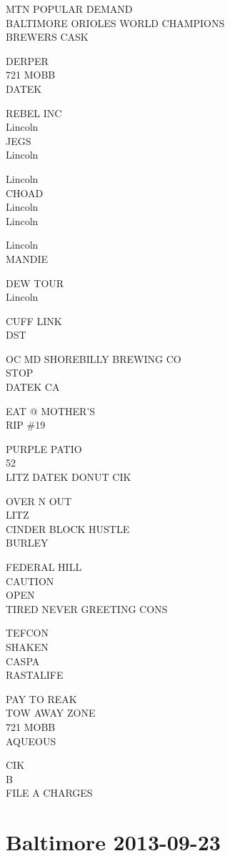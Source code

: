 \documentclass[10pt,letterpaper]{article}
\begin{document}
MTN POPULAR DEMAND\\
BALTIMORE ORIOLES WORLD CHAMPIONS\\
BREWERS CASK

DERPER\\
721 MOBB\\
DATEK

REBEL INC\\
Lincoln\\
JEGS\\
Lincoln

Lincoln\\
CHOAD\\
Lincoln\\
Lincoln

Lincoln\\
MANDIE

DEW TOUR\\
Lincoln

CUFF LINK\\
DST

OC MD SHOREBILLY BREWING CO\\
STOP\\
DATEK CA

EAT @ MOTHER'S\\
RIP \#19

PURPLE PATIO\\
52\\
LITZ DATEK DONUT CIK

OVER N OUT\\
LITZ\\
CINDER BLOCK HUSTLE\\
BURLEY

FEDERAL HILL\\
CAUTION\\
OPEN\\
TIRED NEVER GREETING CONS

TEFCON\\
SHAKEN\\
CASPA\\
RASTALIFE

PAY TO REAK\\
TOW AWAY ZONE\\
721 MOBB\\
AQUEOUS

CIK\\
B\\
FILE A CHARGES


\section*{Baltimore 2013-09-23}
\end{document}
